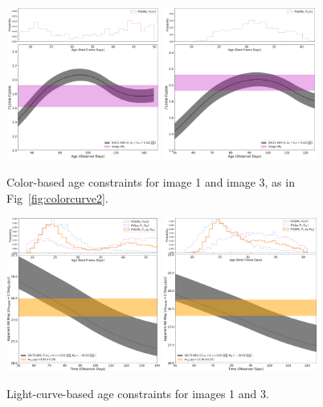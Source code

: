 \documentclass[twocolumn]{aastex63}
\begin{document}
\appendix

\begin{figure}
    \centering
    \includegraphics[width=0.45\textwidth]{Images/colorcurve_image1.pdf}
    \includegraphics[width=0.45\textwidth]{Images/colorcurve_image3.pdf}
    \caption{Color-based age constraints for \SNABC image 1 and image 3, as in Fig~\ref{fig:colorcurve2}.}
    \label{fig:colorcurve13}
\end{figure}

\begin{figure}
    \centering
    \includegraphics[width=0.45\textwidth]{Images/lightcurve_image1.pdf}
    \includegraphics[width=0.45\textwidth]{Images/lightcurve_image3.pdf}
    \caption{Light-curve-based age constraints for \SNABC images 1 and 3.}
    \label{fig:lightcurve13}
\end{figure}
\end{document}

